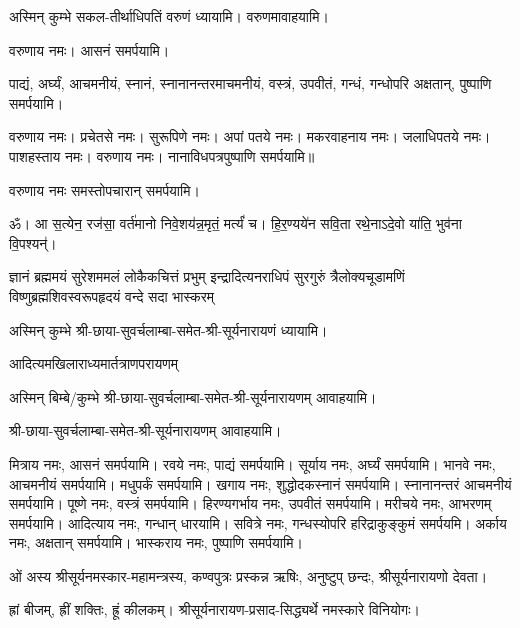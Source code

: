 अस्मिन् कुम्भे सकल-तीर्थाधिपतिं वरुणं ध्यायामि। वरुणमावाहयामि।

वरुणाय नमः। आसनं समर्पयामि।

पाद्यं, अर्घ्यं, आचमनीयं, स्नानं, स्नानानन्तरमाचमनीयं, वस्त्रं, उपवीतं, गन्धं, गन्धोपरि अक्षतान्, पुष्पाणि समर्पयामि।

वरुणाय नमः। प्रचेतसे नमः। सुरूपिणे नमः। अपां पतये नमः। मकरवाहनाय नमः। जलाधिपतये नमः। पाशहस्ताय नमः। वरुणाय नमः। नानाविधपत्रपुष्पाणि समर्पयामि॥

वरुणाय नमः समस्तोपचारान् समर्पयामि।

ॐ। आ स॒त्येन॒ रज॑सा॒ वर्त॑मानो निवे॒शय॑न्न॒मृतं॒ मर्त्यं॑ च। हि॒र॒ण्यये॑न सवि॒ता रथे॒नाऽदे॒वो या॑ति॒ भुव॑ना वि॒पश्यन्॑।

{ज्ञानं ब्रह्ममयं सुरेशममलं लोकैकचित्तं प्रभुम्}
{इन्द्रादित्यनराधिपं सुरगुरुं त्रैलोक्यचूडामणिं}
{विष्णुब्रह्मशिवस्वरूपहृदयं वन्दे सदा भास्करम्}

अस्मिन् कुम्भे श्री-छाया-सुवर्चलाम्बा-समेत-श्री-सूर्यनारायणं ध्यायामि। 

{आदित्यमखिलाराध्यमार्तत्राणपरायणम्}


अस्मिन् बिम्बे/कुम्भे श्री-छाया-सुवर्चलाम्बा-समेत-श्री-सूर्यनारायणम् आवाहयामि।

श्री-छाया-सुवर्चलाम्बा-समेत-श्री-सूर्यनारायणम् आवाहयामि।

\renewcommand{\devAya}{श्री-छाया-सुवर्चलाम्बा-समेत-श्री-सूर्यनारायण-स्वामिने नमः}

मित्राय नमः, आसनं समर्पयामि।
रवये नमः, पाद्यं समर्पयामि।
सूर्याय नमः, अर्घ्यं समर्पयामि।
भानवे नमः, आचमनीयं समर्पयामि। मधुपर्कं समर्पयामि।
खगाय नमः, शुद्धोदकस्नानं समर्पयामि। स्नानानन्तरं आचमनीयं समर्पयामि।
पूष्णे नमः, वस्त्रं समर्पयामि।
हिरण्यगर्भाय नमः, उपवीतं समर्पयामि।
मरीचये नमः, आभरणम् समर्पयामि।
आदित्याय नमः, गन्धान् धारयामि।
सवित्रे नमः, गन्धस्योपरि हरिद्राकुङ्कुमं समर्पयमि।
अर्काय नमः, अक्षतान् समर्पयामि।
भास्कराय नमः, पुष्पाणि समर्पयामि।


ओं अस्य श्रीसूर्यनमस्कार-महामन्त्रस्य, कण्वपुत्रः प्रस्कन्न ऋषिः, अनुष्टुप् छन्दः, श्रीसूर्यनारायणो देवता।

ह्रां बीजम्, ह्रीं शक्तिः, ह्रूं कीलकम्। श्रीसूर्यनारायण-प्रसाद-सिद्ध्यर्थे नमस्कारे विनियोगः।

